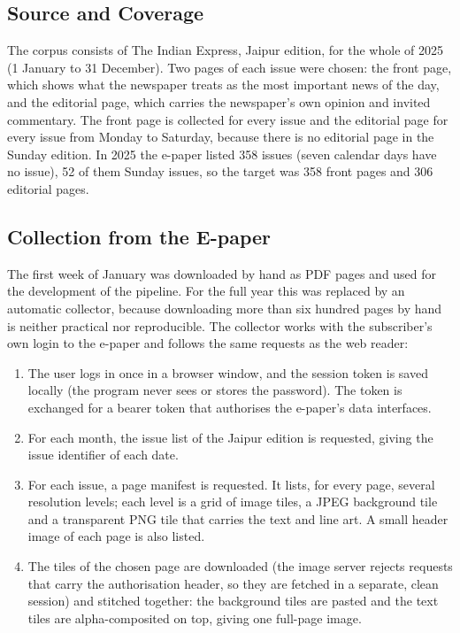 \subsection{Source and Coverage}
The corpus consists of The Indian Express, Jaipur edition, for the whole of 2025 (1 January to 31 December). Two pages of each issue were chosen: the front page, which shows what the newspaper treats as the most important news of the day, and the editorial page, which carries the newspaper's own opinion and invited commentary. The front page is collected for every issue and the editorial page for every issue from Monday to Saturday, because there is no editorial page in the Sunday edition. In 2025 the e-paper listed 358 issues (seven calendar days have no issue), 52 of them Sunday issues, so the target was 358 front pages and 306 editorial pages.

\subsection{Collection from the E-paper}
The first week of January was downloaded by hand as PDF pages and used for the development of the pipeline. For the full year this was replaced by an automatic collector, because downloading more than six hundred pages by hand is neither practical nor reproducible. The collector works with the subscriber's own login to the e-paper and follows the same requests as the web reader:

\begin{enumerate}
\item The user logs in once in a browser window, and the session token is saved locally (the program never sees or stores the password). The token is exchanged for a bearer token that authorises the e-paper's data interfaces.
\item For each month, the issue list of the Jaipur edition is requested, giving the issue identifier of each date.
\item For each issue, a page manifest is requested. It lists, for every page, several resolution levels; each level is a grid of image tiles, a JPEG background tile and a transparent PNG tile that carries the text and line art. A small header image of each page is also listed.
\item The tiles of the chosen page are downloaded (the image server rejects requests that carry the authorisation header, so they are fetched in a separate, clean session) and stitched together: the background tiles are pasted and the text tiles are alpha-composited on top, giving one full-page image.
\end{enumerate}

